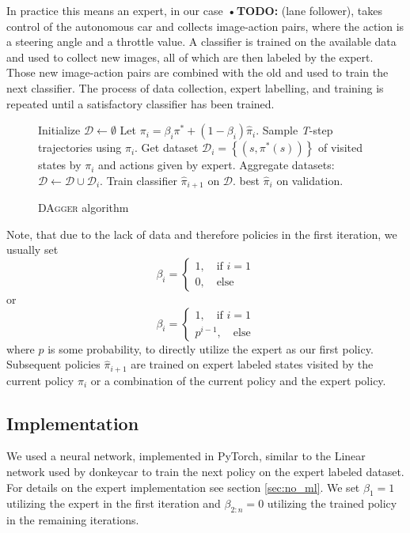 \documentclass[conference]{IEEEtran}
\begin{document}
In practice this means an expert, in our case \textbf{•TODO:} (lane follower), takes control of the autonomous car and collects image-action pairs, where the action is a steering angle and a throttle value. A classifier is trained on the available data and used to collect new images, all of which are then labeled by the expert. Those new image-action pairs are combined with the old and used to train the next classifier. The process of data collection, expert labelling, and training is repeated until a satisfactory classifier has been trained.

\begin{figure}[h]
\begin{algorithmic}[1]
\STATE Initialize \(\mathcal{D}\gets \emptyset\)
\STATE Let \( \pi_i = \beta_i \pi^* + \left( 1- \beta_i\right)\hat{ \pi}_i \).
\STATE Sample \textit{T}-step trajectories using \( \pi_i \).
\STATE Get dataset \( \mathcal{D}_i = \left\{ \left( s, \pi^*(s)\right)\right\} \) of visited states by \( \pi_i \) and actions given by expert.
\STATE Aggregate datasets: \( \mathcal{D}\gets \mathcal{D} \cup \mathcal{D}_i \).
\STATE Train classifier \( \hat{ \pi}_{i+1} \) on \( \mathcal{D} \).
\ENDFOR
\RETURN best \( \hat{ \pi}_i \) on validation.
\end{algorithmic}
\caption{DA\textsc{gger} algorithm}
\label{fig:dagger}
\end{figure}

Note, that due to the lack of data and therefore policies in the first iteration, we usually set
\[
\beta_i = \begin{cases}
1,\quad\text{if }i=1\\
0,\quad\text{else}
\end{cases}
\]
or
\[
\beta_i = \begin{cases}
1,\quad\text{if }i=1\\
p^{i-1},\quad\text{else}
\end{cases}
\]
where \( p \) is some probability, to directly utilize the expert as our first policy. Subsequent policies \( \hat{ \pi}_{i+1} \) are trained on expert labeled states visited by the current policy \( \pi_i \) or a combination of the current policy and the expert policy.

\subsection{Implementation}
We used a neural network, implemented in PyTorch, similar to the Linear network used by donkeycar to train the next policy on the expert labeled dataset. For details on the expert implementation see section \ref{sec:no_ml}. We set \( \beta_1 = 1 \) utilizing the expert in the first iteration and \( \beta_{2:n} = 0 \) utilizing the trained policy in the remaining iterations.
\end{document}
